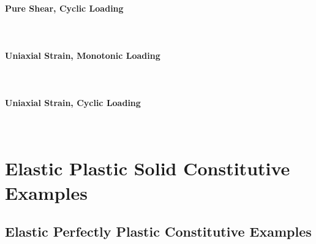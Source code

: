 \documentclass[fleqn,11pt]{article}
\begin{document}
\paragraph{Pure Shear, Cyclic Loading} ~

% 


\paragraph{Uniaxial Strain, Monotonic Loading} ~
\paragraph{Uniaxial Strain, Cyclic Loading} ~



\newpage
\section{Elastic Plastic Solid Constitutive Examples}

\subsection{Elastic Perfectly Plastic Constitutive Examples}
\end{document}
